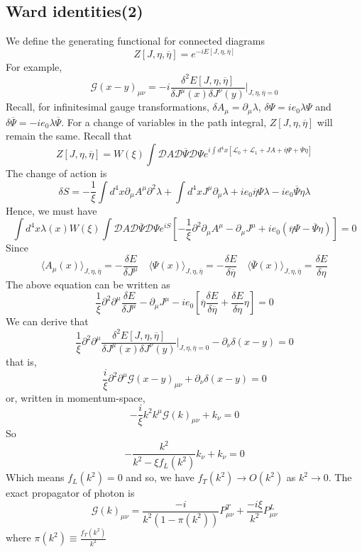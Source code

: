 \subsection{Ward identities(2)}
\noindent
We define the generating functional for connected diagrams
\[Z[J,\eta,\overline{\eta}] = e^{-iE[J,\eta,\overline{\eta}]}\]
For example,
\[\mathcal{G}(x-y)_{\mu\nu} = -i  \frac{\delta^2 E[J,\eta,\overline{\eta}]}{\delta J^{\mu}(x) \delta J^{\nu}(y)}\bigg|_{J,\eta,\overline{\eta}=0}\]
Recall, for infinitesimal gauge transformations, $\delta A_{\mu} = \partial_{\mu} \lambda $, $\delta \Psi = ie_0\lambda\Psi$ and $\delta \overline{\Psi}  = -ie_0 \lambda \overline{\Psi}$. For a change of
variables in the path integral, $Z[J,\eta,\overline{\eta}]$ will remain the same. 
Recall that
\[Z[J,\eta,\overline{\eta}] = W(\xi) \int \mathcal{D}A \mathcal{D}\overline{\Psi} \mathcal{D}\Psi e^{i\int d^4x [\mathcal{L}_0 + \mathcal{L}_1 + JA + \overline{\eta}\Psi + \overline{\Psi}\eta]} \]
The change of action is
\[\delta S = -\frac{1}{\xi} \int d^4x \partial_{\mu} A^{\mu} \partial^2 \lambda + \int d^4x J^{\mu}\partial_{\mu}\lambda + ie_0\overline{\eta}\Psi\lambda - ie_0\overline{\Psi}\eta\lambda\]
Hence, we must have
\[\int d^4x \lambda(x) W(\xi)\int \mathcal{D}A \mathcal{D}\overline{\Psi} \mathcal{D}\Psi e^{iS} \left[ -\frac{1}{\xi} \partial^2 \partial_{\mu} A^{\mu} - \partial_{\mu}J^{\mu}  + ie_0(\overline{\eta}\Psi - \overline{\Psi}\eta)\right] = 0 \]
Since
\[\langle A_{\mu}(x) \rangle_{J,\eta,\overline{\eta}} = - \frac{\delta E}{\delta J^{\mu}} \quad \langle \Psi(x) \rangle_{J,\eta,\overline{\eta}} = - \frac{\delta E}{\delta \overline{\eta}} \quad \langle \overline{\Psi}(x) \rangle_{J,\eta,\overline{\eta}} =  \frac{\delta E}{\delta \eta}\]
The above equation can be written as
\[\frac{1}{\xi} \partial^2 \partial^{\mu}\frac{\delta E}{\delta J^{\mu}} - \partial_{\mu}J^{\mu} - ie_0\left[ \overline{\eta}\frac{\delta E}{\delta \overline{\eta}} + \frac{\delta E}{\delta \eta} \eta \right]=0\]
We can derive that
\[\frac{1}{\xi} \partial^2 \partial^{\mu} \frac{\delta^2 E[J,\eta,\overline{\eta}]}{\delta J^{\mu}(x) \delta J^{\nu}(y)}\bigg|_{J,\eta,\overline{\eta}=0} - \partial_{\nu} \delta(x-y) = 0\]
that is,
\[\frac{i}{\xi}\partial^2 \partial^{\mu} \mathcal{G}(x-y)_{\mu\nu}+ \partial_{\nu} \delta(x-y) = 0 \]
or, written in momentum-space,
\[-\frac{i}{\xi}k^2 k^{\mu} \mathcal{G}(k)_{\mu\nu}+ k_{\nu} = 0\]
So
\[- \frac{k^2}{k^2-\xi f_L(k^2)} k_{\nu} + k_{\nu} = 0\]
Which means $f_L(k^2) =0$ and so, we have $f_T(k^2) \to O(k^2)$ as $k^2 \to 0$. The exact propagator of photon is
\[\mathcal{G}(k)_{\mu\nu} = \frac{-i}{k^2(1-\pi(k^2))}P^T_{\mu\nu} + \frac{-i\xi}{k^2} P^L_{\mu\nu}\]
where $\pi(k^2) \equiv \frac{f_T(k^2)}{k^2}$

